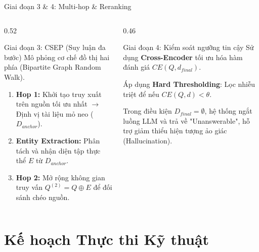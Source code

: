 \documentclass[aspectratio=169,11pt]{beamer}
\begin{document}
\begin{frame}{Giai đoạn 3 \& 4: Multi-hop \& Reranking}
\small
\begin{columns}[T]
\begin{column}{0.52\textwidth}
\begin{block}{Giai đoạn 3: CSEP (Suy luận đa bước)}
Mô phỏng cơ chế đồ thị hai phía (Bipartite Graph Random Walk).
\begin{enumerate}
    \item \textbf{Hop 1:} Khởi tạo truy xuất trên nguồn tối ưu nhất $\rightarrow$ Định vị tài liệu mỏ neo ($D_{anchor}$).
    \item \textbf{Entity Extraction:} Phân tách và nhận diện tập thực thể $E$ từ $D_{anchor}$.
    \item \textbf{Hop 2:} Mở rộng không gian truy vấn $Q^{(2)} = Q \oplus E$ để đối sánh chéo nguồn.
\end{enumerate}
\end{block}
\end{column}
\begin{column}{0.46\textwidth}
\begin{block}{Giai đoạn 4: Kiểm soát ngưỡng tin cậy}
Sử dụng \textbf{Cross-Encoder} tối ưu hóa hàm đánh giá $CE(Q, d_{final})$.

\vspace{0.1cm}
Áp dụng \textbf{Hard Thresholding}: Lọc nhiễu triệt để nếu $CE(Q, d) < \theta$.

\vspace{0.1cm}
Trong điều kiện $D_{final} = \emptyset$, hệ thống ngắt luồng LLM và trả về "Unanswerable", hỗ trợ giảm thiểu hiện tượng ảo giác (Hallucination).
\end{block}
\end{column}
\end{columns}
\end{frame}

\section{Kế hoạch Thực thi Kỹ thuật}
\end{document}
